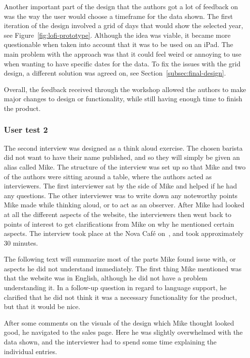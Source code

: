 Another important part of the design that the authors got a lot of feedback on was the way the user would choose a
timeframe for the data shown.
The first iteration of the design involved a grid of days that would show the selected year,
see Figure~\ref{fig:lofi-prototype}.
Although the idea was viable, it became more questionable when taken into account that it was to be used on an iPad.
The main problem with the approach was that it could feel weird or annoying to use when wanting to have specific dates
for the data.
To fix the issues with the grid design, a different solution was agreed on, see Section~\ref{subsec:final-design}.

Overall, the feedback received through the workshop allowed the authors to make major changes to design or
functionality, while still having enough time to finish the product.

\subsubsection{User test 2}\label{subsubsec:user-test-2}
The second interview was designed as a think aloud exercise.
The chosen barista did not want to have their name published, and so they will simply be given an alias called Mike.
The structure of the interview was set up so that Mike and two of the authors were sitting around a table,
where the authors acted as interviewers.
The first interviewer sat by the side of Mike and helped if he had any questions.
The other interviewer was to write down any noteworthy points Mike made while thinking aloud,
or to act as an observer.
After Mike had looked at all the different aspects of the website, the interviewers then went back to points of interest
to get clarifications from Mike on why he mentioned certain aspects.
The interview took place at the Nova Café on~, and took approximately 30 minutes.

The following text will summarize most of the parts Mike found issue with, or aspects he did not understand immediately.
The first thing Mike mentioned was that the website was in English, although he did not have a problem understanding it.
In a follow-up question in regard to language support, he clarified that he did not think it was a necessary
functionality for the product, but that it would be nice.

After some comments on the visuals of the design which Mike thought looked good, he navigated to the sales page.
Here he was slightly overwhelmed with the data shown, and the interviewer had to spend some time explaining the
individual entries.

